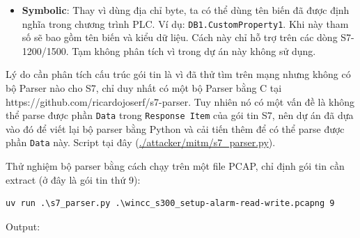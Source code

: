 \documentclass[../main.tex]{subfiles}
\begin{document}
\begin{itemize}
    \item \textbf{Symbolic}: Thay vì dùng địa chỉ byte, ta có thể dùng tên biến đã được định nghĩa trong chương trình PLC. Ví dụ: \texttt{DB1.CustomProperty1}. Khi này tham số sẽ bao gồm tên biến và kiểu dữ liệu. Cách này chỉ hỗ trợ trên các dòng S7-1200/1500. Tạm không phân tích vì trong dự án này không sử dụng.
\end{itemize}


Lý do cần phân tích cấu trúc gói tin là vì đã thử tìm trên mạng nhưng không có bộ Parser nào cho S7, chỉ duy nhất có một bộ Parser bằng C tại  https://github.com/ricardojoserf/s7-parser. Tuy nhiên nó có một vấn đề là không thể parse được phần \texttt{Data} trong \texttt{Response Item} của gói tin S7, nên dự án đã dựa vào đó để viết lại bộ parser bằng Python và cải tiến thêm để có thể parse được phần \texttt{Data} này. Script tại đây (\url{./attacker/mitm/s7_parser.py}).


Thử nghiệm bộ parser bằng cách chạy trên một file PCAP, chỉ định gói tin cần extract (ở đây là gói tin thứ 9):

\begin{verbatim}
uv run .\s7_parser.py .\wincc_s300_setup-alarm-read-write.pcapng 9
\end{verbatim}


Output:
\end{document}
